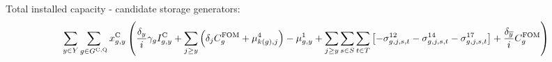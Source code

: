 \documentclass{article}
\begin{document}
%

Total installed capacity - candidate storage generators:
\begin{align}
& \sum\limits_{\iYear \in \sYears} \sum\limits_{\iGenerator \in \sStorageCandidate} \vInstalledCapacity \left(\frac{\cDiscountRate}{\cInterestRate} \cAmortisationRate \cCandidateInvestmentCost + \sum\limits_{\iYearAlias \geq \iYear}\left(\cDiscountRate[\iYearAlias] \cFixedOperationsMaintenanceCostGenerator + \dStorageBuildLimit[k(\iGenerator),\iYearAlias] \right) - \dNonNegativeCandidateCapacity + \sum\limits_{\iYearAlias \geq \iYear} \sum\limits_{\iScenario \in \sScenarios} \sum\limits_{\iInterval \in \sIntervals} \left[- \dMaxChargingRateCandidate[\iGenerator,\iYearAlias,\iScenario,\iInterval] - \dMaxDischargingRateCandidate[\iGenerator,\iYearAlias,\iScenario,\iInterval] - \dMaxStorageEnergyCandidate[\iGenerator,\iYearAlias,\iScenario,\iInterval] \right] + \frac{\cDiscountRate[\iYearTerminal]}{\cInterestRate}\cFixedOperationsMaintenanceCostGenerator\right)\\\nonumber
\end{align}
\end{document}
